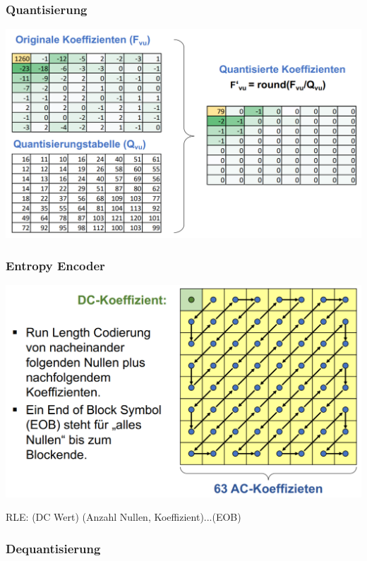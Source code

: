 \subsubsection{Quantisierung}%

\begin{center}
    \includegraphics[width=1\linewidth]{images/quantisierung.png}
\end{center}

\subsubsection{Entropy Encoder}

\begin{center}
    \includegraphics[width=1\linewidth]{images/entropy_encoding.png}
\end{center}

RLE: (DC Wert) (Anzahl Nullen, Koeffizient)...(EOB)

\subsubsection{Dequantisierung}%

